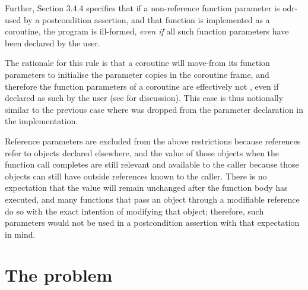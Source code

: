 Further, \cite{P2900R10} Section 3.4.4 specifies that if a non-reference function parameter is odr-used by a postcondition assertion, and that function is implemented as a coroutine, the program is ill-formed, \emph{even if} all such function parameters have been declared  by the user.

The rationale for this rule is that a coroutine will move-from its function parameters to initialise the parameter copies in the coroutine frame, and therefore the function parameters of a coroutine are effectively not , even if declared as such by the user (see \cite{P3387R0} for discussion). This case is thus notionally similar to the previous case where  was dropped from the parameter declaration in the implementation.

Reference parameters are excluded from the above restrictions because references refer to objects declared elsewhere, and the value of those objects when the function call completes are still relevant and available to the caller because those objects can still have outside references known to the caller.  
There is no expectation that the value will remain unchanged after the function body has executed, and many functions that pass an object through a modifiable reference do so with the exact intention of modifying that object; therefore, such parameters would not be used in a postcondition assertion with that expectation in mind.

\section{The problem}

